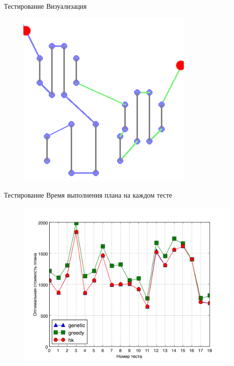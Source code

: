 \documentclass{beamer}
\begin{document}
\begin{frame}{Тестирование}
Визуализация
\begin{figure}[here]
    \includegraphics[scale=0.5]{images/hk2.png}
\end{figure}

\end{frame}


\begin{frame}{Тестирование}
Время выполнения плана на каждом тесте
\begin{figure}[here]
    \includegraphics[scale=0.5]{images/test_small1.jpg}
\end{figure}

\end{frame}
\end{document}
